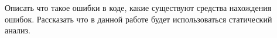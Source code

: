 \intro
Описать что такое ошибки в коде, какие существуют средства нахождения ошибок.
Рассказать что в данной работе будет использоваться статический анализ.
